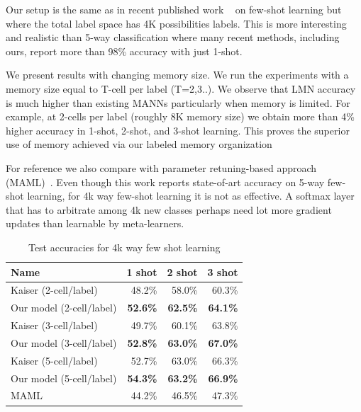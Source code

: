 \documentclass[letterpaper]{article} %
\begin{document}
Our setup is the same as in recent published work ~  on few-shot learning but where the total label space has 4K possibilities labels.  This is more interesting and realistic than 5-way classification where many recent methods, including ours, report more than 98\% accuracy with just 1-shot.

We present results with changing memory size. We run the experiments with a memory size equal to T-cell per label (T=2,3..).  We observe that LMN accuracy is much higher than existing MANNs particularly when memory is limited. For example, at 2-cells per label (roughly 8K memory size) we obtain more than 4\% higher accuracy in 1-shot, 2-shot, and 3-shot learning. This proves the superior use of memory achieved via our labeled memory organization

For reference we also compare with parameter retuning-based approach (MAML)~.  Even though this work reports state-of-art accuracy on 5-way few-shot learning, for 4k way few-shot learning it is not as effective.  A softmax layer that has to arbitrate among 4k new classes perhaps need lot more gradient updates than learnable by meta-learners.


\begin{table}[!htb]
\begin{center}
\begin{tabular}{|l|r|r|r|} \hline
Name &   1 shot &   2 shot &  3 shot \\ \hline
Kaiser (2-cell/label) & 48.2\%	&	58.0\%	&	60.3\% \\
Our model (2-cell/label) & \textbf{52.6\%}	&	\textbf{62.5\%}	&	\textbf{64.1\%} \\ \hline
Kaiser (3-cell/label) & 49.7\%	&	60.1\%	&	63.8\% \\
Our model (3-cell/label) & \textbf{52.8\%}	&	\textbf{63.0\%}	&	\textbf{67.0\%} \\ \hline
Kaiser (5-cell/label) & 52.7\%	&	63.0\%	&	66.3\% \\
Our model (5-cell/label) & \textbf{54.3\%}	&	\textbf{63.2\%}	&	\textbf{66.9\%} \\ \hline
MAML & 44.2\% & 46.5\% & 47.3\%  \\ \hline
\end{tabular}
\end{center}
\vspace{-1.07mm}
\vspace{-2.14mm}
\caption{\label{fewshot-results1} Test accuracies for 4k way few shot learning}

\end{table}
\end{document}
